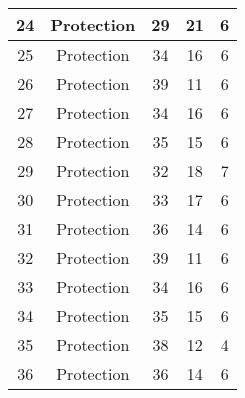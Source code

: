 \documentclass[results.tex]{subfiles}
\begin{document}
\begin{center}
\begin{tabular}{| c || c | c | c | c |}
            \hline
            24                      & Protection                   & 29                     & 21                      & 6                    \\
            \hline
            25                      & Protection                   & 34                     & 16                      & 6                    \\
            \hline
            26                      & Protection                   & 39                     & 11                      & 6                    \\
            \hline
            27                      & Protection                   & 34                     & 16                      & 6                    \\
            \hline
            28                      & Protection                   & 35                     & 15                      & 6                    \\
            \hline
            29                      & Protection                   & 32                     & 18                      & 7                    \\
            \hline
            30                      & Protection                   & 33                     & 17                      & 6                    \\
            \hline
            31                      & Protection                   & 36                     & 14                      & 6                    \\
            \hline
            32                      & Protection                   & 39                     & 11                      & 6                    \\
            \hline
            33                      & Protection                   & 34                     & 16                      & 6                    \\
            \hline
            34                      & Protection                   & 35                     & 15                      & 6                    \\
            \hline
            35                      & Protection                   & 38                     & 12                      & 4                    \\
            \hline
            36                      & Protection                   & 36                     & 14                      & 6                    \\

\end{tabular}
\end{center}
\end{document}
